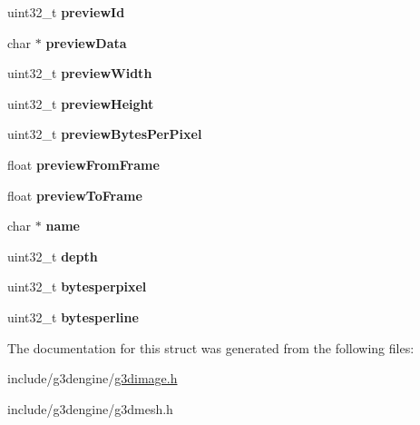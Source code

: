 \begin{DoxyCompactItemize}
uint32\+\_\+t {\bfseries preview\+Id}
\item 
\mbox{\label{struct__G3DIMAGE_a6fd13e79327121a03cfd3488c1c8e491}} 
char $\ast$ {\bfseries preview\+Data}
\item 
\mbox{\label{struct__G3DIMAGE_a19180cbd18557ff69f41fb8a6225386a}} 
uint32\+\_\+t {\bfseries preview\+Width}
\item 
\mbox{\label{struct__G3DIMAGE_a184e096a9c3a03c26b205b12df563197}} 
uint32\+\_\+t {\bfseries preview\+Height}
\item 
\mbox{\label{struct__G3DIMAGE_a5c765b19f1119e7e42e5af1603390c8a}} 
uint32\+\_\+t {\bfseries preview\+Bytes\+Per\+Pixel}
\item 
\mbox{\label{struct__G3DIMAGE_ae8ff037451d0a0b49760ca4b3d8a54df}} 
float {\bfseries preview\+From\+Frame}
\item 
\mbox{\label{struct__G3DIMAGE_a49755e869a76922ea790aac6d25ef46e}} 
float {\bfseries preview\+To\+Frame}
\item 
\mbox{\label{struct__G3DIMAGE_aecd102a9169308ae944de8eb7745bc80}} 
char $\ast$ {\bfseries name}
\item 
\mbox{\label{struct__G3DIMAGE_aa50d652b1825e646dabb3422314f65b8}} 
uint32\+\_\+t {\bfseries depth}
\item 
\mbox{\label{struct__G3DIMAGE_a03ea0aa9c2023886f9ec7bcbc405adaa}} 
uint32\+\_\+t {\bfseries bytesperpixel}
\item 
\mbox{\label{struct__G3DIMAGE_a48f26b9ea91e7f54f5111ea52a7c8c96}} 
uint32\+\_\+t {\bfseries bytesperline}
\end{DoxyCompactItemize}


The documentation for this struct was generated from the following files\+:\begin{DoxyCompactItemize}
\item 
include/g3dengine/\hyperlink{g3dimage_8h}{g3dimage.\+h}\item 
include/g3dengine/g3dmesh.\+h\end{DoxyCompactItemize}
